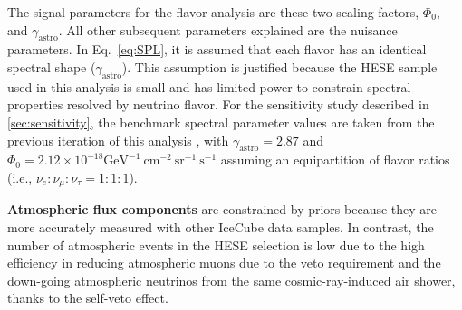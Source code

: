 The signal parameters for the flavor analysis are these two scaling factors, $\Phi_{\mathrm{0}}$, and $\gamma_{\mathrm{astro}}$. All other subsequent parameters explained are the nuisance parameters. In Eq.~\ref{eq:SPL}, it is assumed that each flavor has an identical spectral shape ($\gamma_{\mathrm{astro}}$). This assumption is justified because the HESE sample used in this analysis is small and has limited power to constrain spectral properties resolved by neutrino flavor. For the sensitivity study described in \ref{sec:sensitivity}, the benchmark spectral parameter values are taken from the previous iteration of this analysis , with $\gamma_{\mathrm{astro}} = 2.87$ and $\Phi_{\mathrm{0}} = 2.12 \times 10^{-18} \mathrm{GeV}^{-1}\ \mathrm{cm}^{-2}\ \mathrm{sr}^{-1}\ \mathrm{s}^{-1}$ assuming an equipartition of flavor ratios (i.e., $\nu_e : \nu_{\mu} : \nu_{\tau} = 1:1:1$).

\textbf{Atmospheric flux components} are constrained by priors because they are more accurately measured with other IceCube data samples. In contrast, the number of atmospheric events in the HESE selection is low due to the high efficiency in reducing atmospheric muons due to the veto requirement and the down-going atmospheric neutrinos from the same cosmic-ray-induced air shower, thanks to the self-veto effect.

